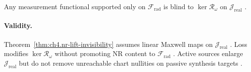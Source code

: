 \begin{corollary}
\label{cor:ch4.farzone-nr-blind}
Any measurement functional supported only on \(\mathcal{F}_{\mathrm{rad}}\) is blind to \(\ker\mathcal{R}_\omega\) on \(\mathcal{J}_{\mathrm{real}}\)
\cite{stratton1941,harrington2001,devaney2004,hansen1988}.
\end{corollary}

\paragraph{Validity.}
Theorem~\ref{thm:ch4.nr-lift-invisibility} assumes linear Maxwell maps on \(\mathcal{J}_{\mathrm{real}}\) \cite{stratton1941}. Loss modifies
\(\ker\mathcal{R}_\omega\) without promoting NR content to \(\mathcal{F}_{\mathrm{rad}}\) \cite{harrington2001,devaney2004}. Active sources enlarge
\(\mathcal{J}_{\mathrm{real}}\) but do not remove unreachable chart nullities on passive synthesis targets \cite{hansen1988}.
